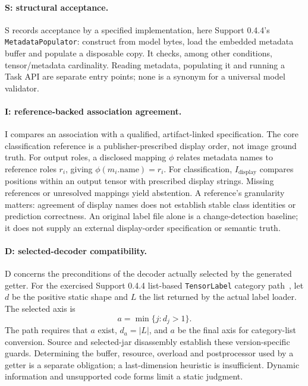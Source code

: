 \documentclass[10pt,conference]{IEEEtran}
\newcommand{\code}[1]{\texttt{#1}}
\begin{document}
\paragraph{S: structural acceptance.}
S records acceptance by a specified implementation, here Support 0.4.4's \code{MetadataPopulator}: construct from model bytes, load the embedded metadata buffer and populate a disposable copy. It checks, among other conditions, tensor/metadata cardinality. Reading metadata, populating it and running a Task API are separate entry points; none is a synonym for a universal model validator.

\paragraph{I: reference-backed association agreement.}
I compares an association with a qualified, artifact-linked specification. The core classification reference is a publisher-prescribed display order, not image ground truth. For output roles, a disclosed mapping $\phi$ relates metadata names to reference roles $r_i$, giving $\phi(m_i.\mathrm{name})=r_i$. For classification, $I_{\mathrm{display}}$ compares positions within an output tensor with prescribed display strings. Missing references or unresolved mappings yield abstention. A reference's granularity matters: agreement of display names does not establish stable class identities or prediction correctness. An original label file alone is a change-detection baseline; it does not supply an external display-order specification or semantic truth.

\paragraph{D: selected-decoder compatibility.}
D concerns the preconditions of the decoder actually selected by the generated getter. For the exercised Support 0.4.4 list-based \code{TensorLabel} category path~\cite{tensorlabel}, let $d$ be the positive static shape and $L$ the list returned by the actual label loader. The selected axis is
\begin{equation}
a=\min\{j:d_j>1\}.
\end{equation}
The path requires that $a$ exist, $d_a=|L|$, and $a$ be the final axis for category-list conversion. Source and selected-jar disassembly establish these version-specific guards. Determining the buffer, resource, overload and postprocessor used by a getter is a separate obligation; a last-dimension heuristic is insufficient. Dynamic information and unsupported code forms limit a static judgment.
\end{document}
